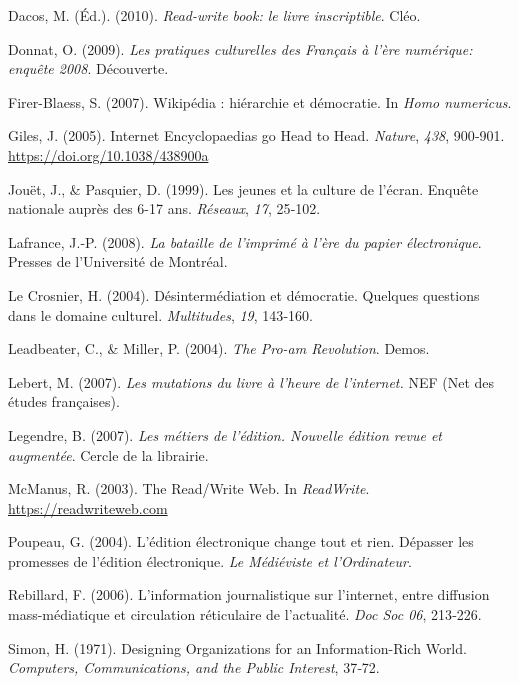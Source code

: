 \documentclass[12pt,french,letterpaper,]{article}
\begin{document}
\leavevmode{}%
Dacos, M. (Éd.). (2010). \emph{Read-write book: le livre inscriptible}.
Cléo.

\leavevmode{}%
Donnat, O. (2009). \emph{Les pratiques culturelles des {Français} à
l'ère numérique: enquête 2008}. Découverte.

\leavevmode{}%
Firer-Blaess, S. (2007). Wikipédia : hiérarchie et démocratie. In
\emph{Homo numericus}.

\leavevmode{}%
Giles, J. (2005). Internet {Encyclopaedias} go {Head} to {Head}.
\emph{Nature}, \emph{438}, 900‑901.
\url{https://doi.org/10.1038/438900a}

\leavevmode{}%
Jouët, J., \& Pasquier, D. (1999). Les jeunes et la culture de l'écran.
{Enquête} nationale auprès des 6-17 ans. \emph{Réseaux}, \emph{17},
25‑102.

\leavevmode{}%
Lafrance, J.-P. (2008). \emph{La bataille de l'imprimé à l'ère du papier
électronique}. Presses de l'Université de Montréal.

\leavevmode{}%
Le Crosnier, H. (2004). Désintermédiation et démocratie. {Quelques}
questions dans le domaine culturel. \emph{Multitudes}, \emph{19},
143‑160.

\leavevmode{}%
Leadbeater, C., \& Miller, P. (2004). \emph{The {Pro}-am {Revolution}}.
Demos.

\leavevmode{}%
Lebert, M. (2007). \emph{Les mutations du livre à l'heure de
l'internet.} NEF (Net des études françaises).

\leavevmode{}%
Legendre, B. (2007). \emph{Les métiers de l'édition. {Nouvelle} édition
revue et augmentée}. Cercle de la librairie.

\leavevmode{}%
McManus, R. (2003). The {Read}/{Write} {Web}. In \emph{ReadWrite}.
\url{https://readwriteweb.com}

\leavevmode{}%
Poupeau, G. (2004). L'édition électronique change tout et rien.
{Dépasser} les promesses de l'édition électronique. \emph{Le Médiéviste
et l'Ordinateur}.

\leavevmode{}%
Rebillard, F. (2006). L'information journalistique sur l'internet, entre
diffusion mass-médiatique et circulation réticulaire de l'actualité.
\emph{Doc {Soc} 06}, 213‑226.

\leavevmode{}%
Simon, H. (1971). Designing {Organizations} for an {Information}-{Rich}
{World}. \emph{Computers, Communications, and the Public Interest},
37‑72.
\end{document}

